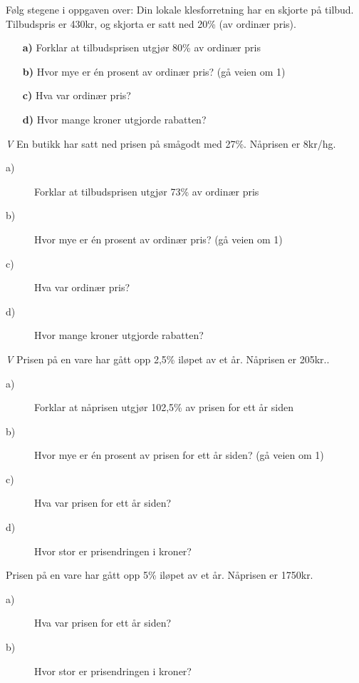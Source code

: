\documentclass[a4, 11pt, twoside]{article}
\theoremstyle{definition}
\begin{document}
\begin{Exercise}
Følg stegene i oppgaven over: \newline
Din lokale klesforretning har en skjorte på tilbud. Tilbudspris er
430kr, og skjorta er satt ned 20\% (av ordinær pris).
\begin{itemize}
\item[\bf a)] Forklar at tilbudsprisen utgjør 80\% av ordinær pris
\item[\bf b)] Hvor mye er én prosent av ordinær pris? (gå veien om 1)
\item[\bf c)] Hva var ordinær pris?
\item[\bf d)] Hvor mange kroner utgjorde rabatten?
\end{itemize}
\end{Exercise}

\begin{Exercise}
\textit{V}\newline
  En butikk har satt ned prisen på smågodt med 27\%. Nåprisen er 8kr/hg.
\begin{description}
\item[a)] Forklar at tilbudsprisen utgjør 73\% av ordinær pris
\item[b)] Hvor mye er én prosent av ordinær pris? (gå veien om 1)
\item[c)] Hva var ordinær pris?
\item[d)] Hvor mange kroner utgjorde rabatten?
\end{description}
\end{Exercise}

\begin{Exercise}
\textit{V}\newline
  Prisen på en vare har gått opp 2,5\% iløpet av et år. Nåprisen er 205kr..
\begin{description}
\item[a)] Forklar at nåprisen utgjør 102,5\% av prisen for ett år siden
\item[b)] Hvor mye er én prosent av prisen for ett år siden? (gå veien om 1)
\item[c)] Hva var prisen for ett år siden?
\item[d)] Hvor stor er prisendringen i kroner?
\end{description}
\end{Exercise}

\begin{Exercise}
  Prisen på en vare har gått opp 5\% iløpet av et år. Nåprisen er 1750kr.
\begin{description}
\item[a)] Hva var prisen for ett år siden?
\item[b)] Hvor stor er prisendringen i kroner?
\end{description}
\end{Exercise}
\end{document}

